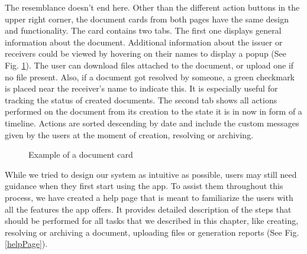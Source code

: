 The resemblance doesn't end here. Other than the different action buttons in the upper right corner, the document cards from both pages have the same design and functionality. The card contains two tabs. The first one displays general information about the document. Additional information about the issuer or receivers could be viewed by hovering on their names to display a popup (See Fig. \ref{documentCard}).  The user can download files attached to the document, or upload one if no file present. Also, if a document got resolved by someone, a green checkmark is placed near the receiver's name to indicate this. It is especially useful for tracking the status of created documents. The second tab shows all actions performed on the document from its creation to the state it is in now in form of a timeline. Actions are sorted descending by date and include the custom messages given by the users at the moment of creation, resolving or archiving.

\begin{figure}[ht]
    \centering
    \qquad
    \caption{Example of a document card}
    \label{documentCard}
\end{figure}

While we tried to design our system as intuitive as possible, users may still need guidance when they first start using the app. To assist them throughout this process, we have created a help page that is meant to familiarize the users with all the features the app offers. It provides detailed description of the steps that should be performed for all tasks that we described in this chapter, like creating, resolving or archiving a document, uploading files or generation reports (See Fig. \ref{helpPage}).

